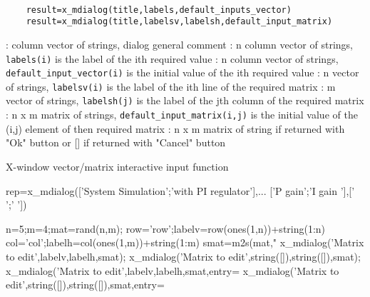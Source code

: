 
\begin{mandesc}
   \\ %
\end{mandesc}
\label{x-mdialog}
\begin{calling_sequence}
  \begin{verbatim}
    result=x_mdialog(title,labels,default_inputs_vector)   
    result=x_mdialog(title,labelsv,labelsh,default_input_matrix)   
  \end{verbatim}
\end{calling_sequence}

\begin{parameters}
  \begin{varlist}
     : column vector of strings, dialog general comment
     : n column vector of strings, \verb!labels(i)! is the label of  the ith required value
     : n  column vector of strings, \verb!default_input_vector(i)! is the initial value of  the ith required value
     : n  vector of strings, \verb!labelsv(i)! is the label of  the ith line of the required matrix
     : m  vector of strings, \verb!labelsh(j)! is the label of  the jth column of the required matrix
     : n x m matrix of strings, \verb!default_input_matrix(i,j)! is the initial value of the (i,j) element of then required matrix
     : n x m matrix of string if returned with "Ok" button or [] if returned with "Cancel" button
  \end{varlist}
\end{parameters}
\begin{mandescription}
  X-window vector/matrix interactive input function
\end{mandescription}
\begin{examples}
  \begin{program}
    rep=x_mdialog(['System Simulation';'with PI regulator'],...
    ['P gain';'I gain '],[' ';' '])
    
    n=5;m=4;mat=rand(n,m);
    row='row';labelv=row(ones(1,n))+string(1:n)
    col='col';labelh=col(ones(1,m))+string(1:m)
    smat=m2s(mat,"%
    x_mdialog('Matrix to edit',labelv,labelh,smat);
    x_mdialog('Matrix to edit',string([]),string([]),smat);
    x_mdialog('Matrix to edit',labelv,labelh,smat,entry=%
    x_mdialog('Matrix to edit',string([]),string([]),smat,entry=%
  \end{program}
\end{examples}
\begin{manseealso}
         
\end{manseealso}

